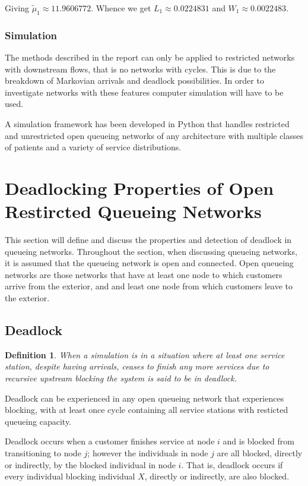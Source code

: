 \documentclass{article}
\newtheorem{definition}{Definition}
\begin{document}
Giving $\tilde{\mu}_1 \approx 11.9606772$.
Whence we get $L_1 \approx 0.0224831$ and $W_1 \approx 0.0022483$.


\subsubsection{Simulation}
The methods described in the report can only be applied to restricted networks with downstream flows, that is no networks with cycles.
This is due to the breakdown of Markovian arrivals and deadlock possibilities.
In order to investigate networks with these features computer simulation will have to be used.

A simulation framework has been developed in Python that handles restricted and unrestricted open queueing networks of any architecture with multiple classes of patients and a variety of service distributions.



\section{Deadlocking Properties of Open Restircted Queueing Networks}

This section will define and discuss the properties and detection of deadlock in queueing networks.
Throughout the section, when discussing queueing networks, it is assumed that
the queueing network is open and connected.
Open queueing networks are those networks that have at least one node to which customers arrive from the exterior, and and least one node from which customers leave to the exterior.

\subsection{Deadlock}

\begin{definition}
    When a simulation is in a situation where at least one service station,
    despite having arrivals, ceases to finish any more services
    due to recursive upstream blocking the system is said to be in deadlock.
\end{definition}

Deadlock can be experienced in any open queueing network that experiences
blocking, with at least once cycle containing all service stations with
resticted queueing capacity.

Deadlock occurs when a customer finishes service at node $i$ and is blocked from transitioning to node $j$; however the individuals in node $j$ are all blocked, directly or indirectly, by the blocked individual in node $i$.
That is, deadlock occurs if every individual blocking individual $X$, directly or indirectly, are also blocked.
\end{document}

